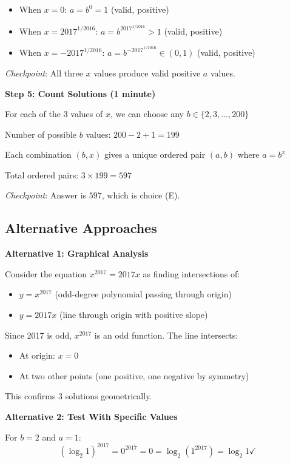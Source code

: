 \documentclass[]{article}
\begin{document}
\begin{solutionbox}
\begin{itemize}
    \item When $x = 0$: $a = b^0 = 1$ (valid, positive)
    \item When $x = 2017^{1/2016}$: $a = b^{2017^{1/2016}} > 1$ (valid, positive)
    \item When $x = -2017^{1/2016}$: $a = b^{-2017^{1/2016}} \in (0,1)$ (valid, positive)
\end{itemize}

\textit{Checkpoint}: All three $x$ values produce valid positive $a$ values.

\textbf{Step 5: Count Solutions (1 minute)}

For each of the 3 values of $x$, we can choose any $b \in \{2, 3, \ldots, 200\}$

Number of possible $b$ values: $200 - 2 + 1 = 199$

Each combination $(b, x)$ gives a unique ordered pair $(a, b)$ where $a = b^x$

Total ordered pairs: $3 \times 199 = 597$

\textit{Checkpoint}: Answer is $\boxed{597}$, which is choice (E).

\subsection*{Alternative Approaches}

\textbf{Alternative 1: Graphical Analysis}

Consider the equation $x^{2017} = 2017x$ as finding intersections of:
\begin{itemize}
    \item $y = x^{2017}$ (odd-degree polynomial passing through origin)
    \item $y = 2017x$ (line through origin with positive slope)
\end{itemize}

Since 2017 is odd, $x^{2017}$ is an odd function. The line intersects:
\begin{itemize}
    \item At origin: $x=0$
    \item At two other points (one positive, one negative by symmetry)
\end{itemize}

This confirms 3 solutions geometrically.

\textbf{Alternative 2: Test With Specific Values}

For $b=2$ and $a=1$: 
\[(\log_2 1)^{2017} = 0^{2017} = 0 = \log_2(1^{2017}) = \log_2 1 \checkmark\]


\end{solutionbox}
\end{document}
